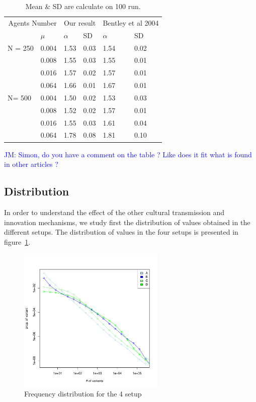 \documentclass{wscpaperproc}
\newcommand{\memo}[2]{\textcolor{#1}{#2}}
\newcommand{\jm}[1]{\memo{blue}{JM: #1\\}}
\begin{document}
\begin{table}[h]
	\centering
	\begin{tabular}{ll|llll}
		\multicolumn{2}{r}{Agents Number}&\multicolumn{2}{c}{Our result}&\multicolumn{2}{c}{Bentley et al 2004}\\
			&$\mu$ & $\alpha$ & SD&$\alpha$&SD\\\hline
		N = 250	&0.004&1.53&0.03&1.54&0.02\\
			&0.008&1.55&0.03&1.55&0.01\\
			&0.016&1.57&0.02&1.57&0.01\\
			&0.064&1.66&0.01&1.67&0.01\\\hline
		N= 500	&0.004&1.50&0.02&1.53&0.03\\
			&0.008&1.52&0.02&1.57&0.01\\
			&0.016&1.55&0.03&1.61&0.04\\
			&0.064&1.78&0.08&1.81&0.10\\
	\end{tabular}
	\caption{Mean \& SD are calculate on 100 run.}
	\label{tab:mualpha}
\end{table}

\jm{Simon, do you have a comment on the table ? Like does it fit what is found in other articles ?}

\subsection{Distribution}

In order to understand the effect of the other cultural transmission and innovation mechanisms, we study first the distribution of values obtained in the different setups. The distribution of values in the four setups is presented in figure~\ref{fig:4setDi}. 

\begin{figure}[H]
	\begin{center}
		\includegraphics[width=7cm]{img/frequenciesABCD.pdf}
	\end{center}
	\caption{Frequency distribution for the 4 setup}
	\label{fig:4setDi}
\end{figure}
\end{document}
